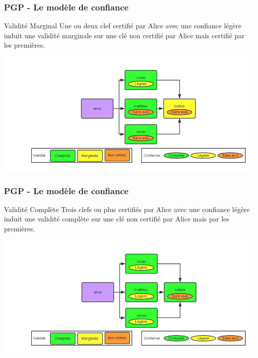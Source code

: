 \begin{frame}
  \frametitle{\color{white}PGP - Le modèle de confiance}
    \begin{block}{Validité Marginal}
      Une ou deux clef certifié par Alice avec une confiance légère 
      induit une validité marginale sur une clé non certifié par Alice
      mais certifié par les premières.
    \end{block}
    \includegraphics[scale=0.3]{tdcdemoMarginal.png}
\end{frame}
\begin{frame}
  \frametitle{\color{white}PGP - Le modèle de confiance}
    \begin{block}{Validité Complète}
      Trois clefs ou plus certifiés par Alice avec une confiance légère
      induit une validité complète sur une clé non certifié par Alice mais par les premières.
    \end{block}
    \includegraphics[scale=0.3]{tdcdemoComplete1.png}
\end{frame}
